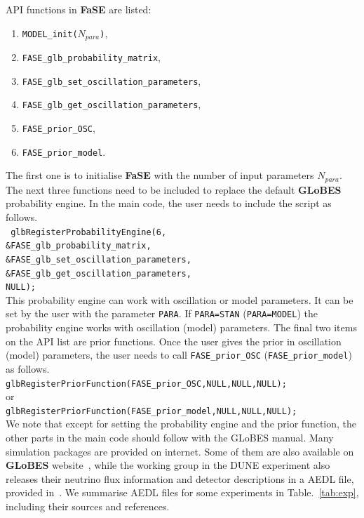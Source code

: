\documentclass[aps,prd,nofootinbib,preprint]{revtex4}
\begin{document}
API functions in \textbf{FaSE} are listed:
\begin{enumerate}
\item \texttt{MODEL\_init($N_{para}$)},
\item  \texttt{FASE\_glb\_probability\_matrix},
\item  \texttt{FASE\_glb\_set\_oscillation\_parameters},
\item  \texttt{FASE\_glb\_get\_oscillation\_parameters},
\item \texttt{FASE\_prior\_OSC},
\item \texttt{FASE\_prior\_model}.
\end{enumerate}
The first one is to initialise \textbf{FaSE} with the number of input parameters $N_{para}$. The next three functions need to be included to replace the default \textbf{GLoBES} probability engine. {\color{blue}In the main code, the user needs to include the script as follows.}\vspace{0.2cm}\\
\texttt{    glbRegisterProbabilityEngine(6,\\
                                 \&FASE\_glb\_probability\_matrix,\\
                                 \&FASE\_glb\_set\_oscillation\_parameters,\\
                                 \&FASE\_glb\_get\_oscillation\_parameters,\\
                                 NULL); }\vspace{0.2cm}\\ 
This probability engine can work with oscillation or model parameters. It can be set by the user with the parameter \texttt{PARA}. If \texttt{PARA=STAN} (\texttt{PARA=MODEL}) the probability engine works with oscillation (model) parameters. The final two items on the API list are prior functions. Once the user gives the prior in oscillation (model) parameters, the user needs to call \texttt{FASE\_prior\_OSC} (\texttt{FASE\_prior\_model}) as follows.\vspace{0.2cm}\\
\texttt{glbRegisterPriorFunction(FASE\_prior\_OSC,NULL,NULL,NULL); }  \\
or\\
\texttt{glbRegisterPriorFunction(FASE\_prior\_model,NULL,NULL,NULL); } \vspace{0.2cm}\\
We note that except for setting the probability engine and the prior function, the other parts in the main code should follow with the GLoBES manual. 
%
%
{\color{blue}Many simulation packages are provided on internet. Some of them are also available on \textbf{GLoBES} website~\cite{GLoBES}, while the working group in the DUNE experiment also releases their neutrino flux information and detector descriptions in a AEDL file, provided in~\cite{Alion:2016uaj}. We summarise AEDL files for some experiments in Table.~\ref{tab:exp}, including their sources and references.}
\end{document}
